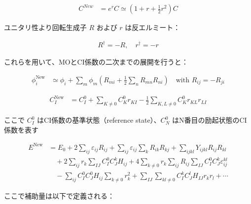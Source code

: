 \documentclass{article}
\begin{document}
\begin{equation}
\begin{split}
C^{New} &= e^r C \simeq \left(1 + r + \frac{1}{2} r^2\right) C
\label{}
\end{split}
\end{equation}

ユニタリ性より回転生成子 \( R \) および \( r \) は反エルミート：

\begin{equation}
\begin{split}
R^\dagger = -R, \quad r^\dagger = -r
\label{}
\end{split}
\end{equation}

これらを用いて、MOとCI係数の二次までの展開を行うと：

\begin{equation}
\begin{split}
\phi_i^{\text{New}} &\simeq \phi_i + \sum_m \phi_m  \left(R_{mi} + \frac{1}{2} \sum_{n} R_{mn} R_{ni} \right)
\quad \text{with } R_{ij} = -R_{ji}
\label{}
\end{split}
\end{equation}

\begin{equation}
\begin{split}
C_I^{\text{New}} &= C_I^0 + \sum_{K \ne 0} C_K^0 r_{KI} - \frac{1}{2} \sum_{K,L \ne 0} C_K^0 r_{KL} r_{LI}
\label{}
\end{split}
\end{equation}

ここで \( C_I^0 \) はCI係数の基準状態（reference state）、\( C_N^0 \) はN番目の励起状態のCI係数を表す

\begin{equation}
\begin{split}
E^{\text{New}} &= E_0 + 2 \sum_{ij} \varepsilon_{ij} R_{ij} 
+ \sum_{ij} \varepsilon_{ij} \sum_k R_{ik} R_{kj} 
+ \sum_{ijkl} Y_{ijkl} R_{ij} R_{kl} \\
&\quad + 2 \sum_{ij} r_{k} \sum_{IJ} C_I^0 C_J^k H_{ij}
+ 4 \sum_{k \ne 0} r_k \sum_{ij} R_{ij} \sum_{IJ} C_I^0 C_J^k \varepsilon_{ij}^{kl} \\
&\quad - \sum_{ij} C_I^0 C_J^0 H_{ij} \sum_{k \ne 0} r_k^2 
+ \sum_{IJ}\sum_{kl \ne 0} C_I^k C_J^l H_{IJ} r_k r_l + \cdots
\label{}
\end{split}
\end{equation}

ここで補助量は以下で定義される：
\end{document}
